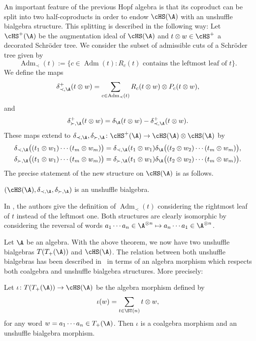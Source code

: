 An important feature of the previous Hopf algebra is that its coproduct can be split into two half-coproducts in order to endow $\cHS(\A)$ with an unshuffle bialgebra structure. This splitting is described in the following way: Let $\cHS^+(\A)$ be the augmentation ideal of $\cHS(\A)$ and $t\otimes w \in \cHS^+$ a decorated Schr\"oder tree. We consider the subset of admissible cuts of a Schr\"oder tree given by
\[
	\operatorname{Adm}_\prec(t) := \{c\in \operatorname{Adm}(t)\colon \text{$R_c(t)$ contains the leftmost leaf of $t$}\}.
\]
We define the maps
\[
	\delta^+_{\prec,\A} (t\otimes w)= \sum_{c\in \operatorname{Adm}_\prec(t)} R_c(t\otimes w)\otimes P_c(t\otimes w),
\]
and
\[
	\delta_{\succ,\A}^+(t\otimes w) = \delta_\A(t\otimes w) - \delta_{\prec,\A}^+(t\otimes w).
 \]
These maps extend to $\delta_{\prec,\A},\delta_{\succ,\A} \colon \cHS^+(\A) \to \cHS(\A)\otimes \cHS(\A)$ by
\begin{align*}
	\delta_{\prec,\A}\big((t_1\otimes w_1)\cdots (t_m\otimes w_m)\big)
	&= \delta_{\prec,\A}(t_1\otimes w_1)\delta_\A\big((t_2\otimes w_2)\cdots (t_m\otimes w_m)\big),\\
	\delta_{\succ,\A}\big((t_1\otimes w_1)\cdots (t_m\otimes w_m)\big)
	&= \delta_{\succ,\A}(t_1\otimes w_1)\delta_\A\big((t_2\otimes w_2)\cdots (t_m\otimes w_m)\big).
\end{align*}
The precise statement of the new structure on $\cHS(\A)$ is as follows.

\begin{Theorem}
$(\cHS(\A),\delta_{\prec,\A},\delta_{\succ,\A})$ is an unshuffle bialgebra.
\end{Theorem}

\begin{Remark}
In \cite{JMNT}, the authors give the definition of $\operatorname{Adm}_\prec(t)$ considering the rightmost leaf of $t$ instead of the leftmost one. Both structures are clearly isomorphic by considering the reversal of words $a_1\cdots a_n \in \A^{\otimes n}\mapsto a_n\cdots a_1 \in \A^{\otimes n}$.
\end{Remark}

Let $\A$ be an algebra. With the above theorem, we now have two unshuffle bialgebras $T(T_+(\A))$ and $\cHS(\A)$. The relation between both unshuffle bialgebras has been described in~\cite{JMNT} in terms of an algebra morphism which respects both coalgebra and unshuffle bialgebra structures. More precisely:

\begin{Theorem}
Let $\iota\colon T(T_+(\A))\to \cHS(\A)$ be the algebra morphism defined by
\begin{equation}\label{eq:iota}
	\iota(w) = \sum_{t\in \ST(n)} t\otimes w,
\end{equation}
for any word $w= a_1\cdots a_n \in T_+(\A)$. Then $\iota$ is a coalgebra morphism and an unshuffle bialgebra morphism.
\end{Theorem}


